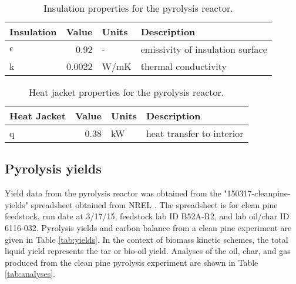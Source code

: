 \begin{table}[H]
    \centering
    \caption{Insulation properties for the pyrolysis reactor.}
    \label{tab:insulation}
    \begin{tabular}{lrll}
        \toprule
        Insulation & Value & Units & Description \\
        \midrule
        $\epsilon$ & 0.92 & - & emissivity of insulation surface \\
        k & 0.0022 & W/mK & thermal conductivity \\
        \bottomrule
    \end{tabular}
\end{table}

\begin{table}[H]
    \centering
    \caption{Heat jacket properties for the pyrolysis reactor.}
    \label{tab:heatjacket}
    \begin{tabular}{lrll}
        \toprule
        Heat Jacket & Value & Units & Description \\
        \midrule
        q & 0.38 & kW & heat transfer to interior \\
        \bottomrule
    \end{tabular}
\end{table}

\subsection{Pyrolysis yields}

Yield data from the pyrolysis reactor was obtained from the "150317-cleanpine-yields" spreadsheet obtained from NREL \cite{French-2019}. The spreadsheet is for clean pine feedstock, run date at 3/17/15, feedstock lab ID B52A-R2, and lab oil/char ID 6116-032. Pyrolysis yields and carbon balance from a clean pine experiment are given in Table \ref{tab:yields}. In the context of biomass kinetic schemes, the total liquid yield represents the tar or bio-oil yield. Analyses of the oil, char, and gas produced from the clean pine pyrolysis experiment are shown in Table \ref{tab:analyses}.

